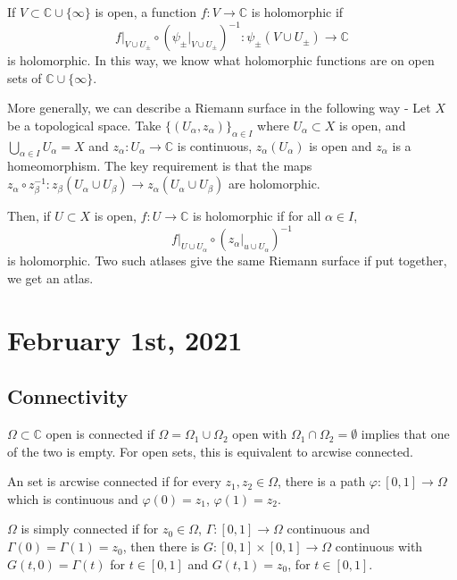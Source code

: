 \documentclass[12pt]{scrartcl}
\newcommand{\C}{\mathbb C}
\let \phi \varphi
\begin{document}
If $V \subset \C \cup \{\infty\}$ is open, a function $f: V \to \C$ is holomorphic if 
$$f \vert_{V \cup U_\pm}\circ (\psi_{\pm}\vert_{V \cup U_\pm})^{-1}: \psi_\pm(V \cup U_\pm) \to \C$$
is holomorphic.  In this way, we know what holomorphic functions are on open sets of $\C \cup \{\infty\}$.

More generally, we can describe a Riemann surface in the following way - Let $X$ be a topological space.  Take $\{(U_\alpha, z_\alpha)\}_{\alpha \in I}$ where $U_\alpha \subset X$ is open, and $\bigcup_{\alpha \in I} U_\alpha = X$ and $z_\alpha: U_\alpha \to \C$ is continuous, $z_\alpha(U_\alpha)$ is open and $z_\alpha$ is a homeomorphism.  The key requirement is that the maps $z_\alpha \circ z_\beta^{-1}: z_\beta(U_\alpha \cup U_\beta) \to z_\alpha(U_\alpha \cup U_\beta)$ are holomorphic.

Then, if $U \subset X$ is open, $f: U \to \C$ is holomorphic if for all $\alpha \in I$,
$$f\vert_{U \cup U_\alpha} \circ (z_\alpha \vert_{u \cup U_\alpha})^{-1}$$
is holomorphic.  Two such atlases give the same Riemann surface if put together, we get an atlas.
\pagebreak
\section{February 1st, 2021}
\subsection{Connectivity}
\begin{definition} $\Omega\subset \C$ open is connected if $\Omega = \Omega_1 \cup \Omega_2$ open with $\Omega_1 \cap \Omega_2 = \emptyset$ implies that one of the two is empty.  For open sets, this is equivalent to arcwise connected.
\end{definition}


\begin{definition} An set is arcwise connected if for every $z_1, z_2 \in \Omega$, there is a path $\phi: [0, 1] \to \Omega$ which is continuous and $\phi(0) = z_1$, $\phi(1) = z_2$.
\end{definition}

\begin{definition} $\Omega$ is simply connected if for $z_0 \in \Omega$, $\Gamma:[0, 1] \to \Omega$
 continuous and $\Gamma(0) = \Gamma(1) = z_0$, then there is $G:[0, 1] \times [0, 1] \to \Omega$ continuous with $G(t, 0) = \Gamma(t)$ for $t \in [0, 1]$ and $G(t, 1) = z_0$, for $t \in [0, 1]$.  
 \end{definition}
 
\end{document}
